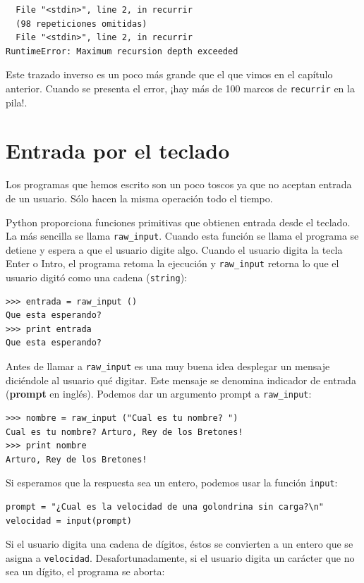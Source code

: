\beforeverb
\begin{verbatim}
  File "<stdin>", line 2, in recurrir
  (98 repeticiones omitidas)
  File "<stdin>", line 2, in recurrir
RuntimeError: Maximum recursion depth exceeded
\end{verbatim}
\afterverb
%
Este trazado inverso es un poco más grande que el que vimos en el 
capítulo anterior. Cuando se presenta el error, ¡hay más de
100 marcos de \texttt{recurrir} en la pila!.




\section{Entrada por el teclado}

Los programas que hemos escrito son un poco toscos ya que no aceptan 
entrada de un usuario. Sólo hacen la misma operación todo el tiempo.

Python proporciona funciones primitivas que obtienen entrada desde el 
teclado. La más sencilla se llama \texttt{raw\_input}. Cuando esta función
se llama el programa se detiene y espera a que el usuario digite algo.
Cuando el usuario digita la tecla Enter o Intro, el programa retoma
la ejecución y \texttt{raw\_input} retorna lo que el usuario digitó
como una cadena (\texttt{string}):

\beforeverb
\begin{verbatim}
>>> entrada = raw_input ()
Que esta esperando?
>>> print entrada
Que esta esperando?
\end{verbatim}
\afterverb
%
Antes de llamar a  \texttt{raw\_input} es una muy buena idea desplegar
un mensaje diciéndole al usuario qué digitar. Este mensaje se denomina
indicador de entrada  ({\bf prompt}  en inglés).  
Podemos dar un argumento prompt a  \texttt{raw\_input}:


\beforeverb
\begin{verbatim}
>>> nombre = raw_input ("Cual es tu nombre? ")
Cual es tu nombre? Arturo, Rey de los Bretones!
>>> print nombre
Arturo, Rey de los Bretones!
\end{verbatim}
\afterverb
%
Si esperamos que la respuesta sea un entero, podemos usar la función \texttt{input}:

\beforeverb
\begin{verbatim}
prompt = "¿Cual es la velocidad de una golondrina sin carga?\n"
velocidad = input(prompt)
\end{verbatim}
\afterverb
%
Si el usuario digita una cadena de dígitos, éstos se convierten
a un entero que se asigna a \texttt{velocidad}.  Desafortunadamente, si el usuario
digita un carácter que no sea un dígito, el programa se aborta:

